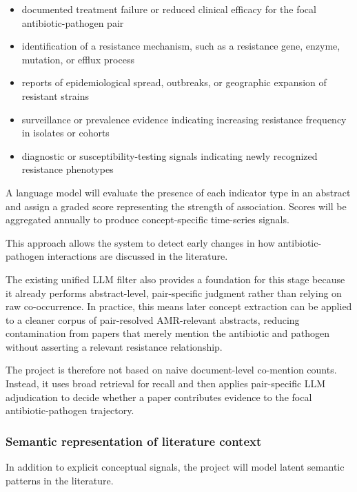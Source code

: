 \documentclass[
]{article}
\providecommand{\tightlist}{%
  \setlength{\itemsep}{0pt}\setlength{\parskip}{0pt}}
\begin{document}
\begin{itemize}
\tightlist
\item
  documented treatment failure or reduced clinical efficacy for the
  focal antibiotic-pathogen pair
\item
  identification of a resistance mechanism, such as a resistance gene,
  enzyme, mutation, or efflux process
\item
  reports of epidemiological spread, outbreaks, or geographic expansion
  of resistant strains
\item
  surveillance or prevalence evidence indicating increasing resistance
  frequency in isolates or cohorts
\item
  diagnostic or susceptibility-testing signals indicating newly
  recognized resistance phenotypes
\end{itemize}

A language model will evaluate the presence of each indicator type in an
abstract and assign a graded score representing the strength of
association. Scores will be aggregated annually to produce
concept-specific time-series signals.

This approach allows the system to detect early changes in how
antibiotic-pathogen interactions are discussed in the literature.

The existing unified LLM filter also provides a foundation for this
stage because it already performs abstract-level, pair-specific judgment
rather than relying on raw co-occurrence. In practice, this means later
concept extraction can be applied to a cleaner corpus of pair-resolved
AMR-relevant abstracts, reducing contamination from papers that merely
mention the antibiotic and pathogen without asserting a relevant
resistance relationship.

The project is therefore not based on naive document-level co-mention
counts. Instead, it uses broad retrieval for recall and then applies
pair-specific LLM adjudication to decide whether a paper contributes
evidence to the focal antibiotic-pathogen trajectory.

\subsubsection{Semantic representation of literature
context}\label{44-semantic-representation-of-literature-context}

In addition to explicit conceptual signals, the project will model
latent semantic patterns in the literature.
\end{document}
